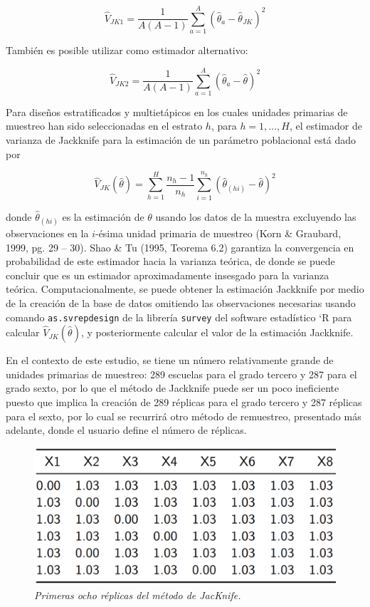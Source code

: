 \documentclass[12pt,spanish,]{book}
\begin{document}
\[\hat{V}_{JK1}=\dfrac{1}{A(A-1)}\sum_{a=1}^{A}\left(\hat{\theta}_{a}-\hat{\theta}_{JK}\right)^{2}\]

También es posible utilizar como estimador alternativo:

\[\hat{V}_{JK2}=\dfrac{1}{A(A-1)}\sum_{a=1}^{A}\left(\hat{\theta}_{a}-\hat{\theta}\right)^{2}\]

Para diseños estratificados y multietápicos en los cuales unidades primarias de muestreo han sido seleccionadas en el estrato \(h\), para \(h=1, \ldots, H\), el estimador de varianza de Jackknife para la estimación de un parámetro poblacional está dado por

\[ \hat{V}_{JK}(\hat{\theta}) = \sum_{h=1}^H \frac{n_h - 1}{n_h} \sum_{i=1}^{n_h}
(\hat{\theta}_{(hi)}-\hat{\theta})^2\]

donde \(\hat{\theta}_{(hi)}\) es la estimación de \(\theta\) usando los datos de la muestra excluyendo las observaciones en la \(i\)-ésima unidad primaria de muestreo (Korn \& Graubard, 1999, pg. 29 -- 30). Shao \& Tu (1995, Teorema 6.2) garantiza la convergencia en probabilidad de este estimador hacia la varianza teórica, de donde se puede concluir que es un estimador aproximadamente insesgado para la varianza teórica. Computacionalmente, se puede obtener la estimación Jackknife por medio de la creación de la base de datos omitiendo las observaciones necesarias usando comando \texttt{as.svrepdesign} de la librería \texttt{survey} del software estadístico `R para calcular \(\hat{V}_{JK}(\hat{\theta})\), y posteriormente calcular el valor de la estimación Jackknife.

En el contexto de este estudio, se tiene un número relativamente grande de unidades primarias de muestreo: 289 escuelas para el grado tercero y 287 para el grado sexto, por lo que el método de Jackknife puede ser un poco ineficiente puesto que implica la creación de 289 réplicas para el grado tercero y 287 réplicas para el sexto, por lo cual se recurrirá otro método de remuestreo, presentado más adelante, donde el usuario define el número de réplicas.

\begin{figure}
\centering
\includegraphics{Pics/20.png}
\caption{\emph{Primeras ocho réplicas del método de JacKnife.}}
\end{figure}
\end{document}

